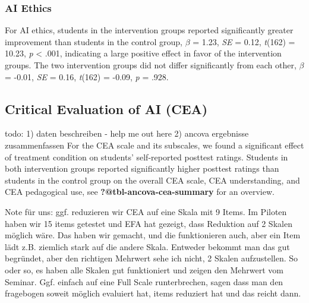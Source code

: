 \documentclass[
  letterpaper,
  DIV=11,
  numbers=noendperiod]{scrartcl}
\begin{document}
\subsubsection{AI Ethics}\label{ai-ethics}

For AI ethics, students in the intervention groups reported
significantly greater improvement than students in the control group,
\(\beta\) = 1.23, \emph{SE} = 0.12, \emph{t}(162) = 10.23, \emph{p}
\textless{} .001, indicating a large positive effect in favor of the
intervention groups. The two intervention groups did not differ
significantly from each other, \(\beta\) = -0.01, \emph{SE} = 0.16,
\emph{t}(162) = -0.09, \emph{p} = .928.

\subsection{Critical Evaluation of AI
(CEA)}\label{critical-evaluation-of-ai-cea}

todo: 1) daten beschreiben - help me out here 2) ancova ergebnisse
zusammenfassen For the CEA scale and its subscales, we found a
significant effect of treatment condition on students' self-reported
posttest ratings. Students in both intervention groups reported
significantly higher posttest ratings than students in the control group
on the overall CEA scale, CEA understanding, and CEA pedagogical use,
see \textbf{?@tbl-ancova-cea-summary} for an overview.

\begin{tcolorbox}[enhanced jigsaw, breakable, colback=white, opacitybacktitle=0.6, colbacktitle=quarto-callout-note-color!10!white, leftrule=.75mm, colframe=quarto-callout-note-color-frame, toprule=.15mm, opacityback=0, coltitle=black, bottomrule=.15mm, bottomtitle=1mm, toptitle=1mm, titlerule=0mm, title=\textcolor{quarto-callout-note-color}{\faInfo}\hspace{0.5em}{Note}, arc=.35mm, rightrule=.15mm, left=2mm]

Note für uns: ggf. reduzieren wir CEA auf eine Skala mit 9 Items. Im
Piloten haben wir 15 items getestet und EFA hat gezeigt, dass Reduktion
auf 2 Skalen möglich wäre. Das haben wir gemacht, und die funktionieren
auch, aber ein Item lädt z.B. ziemlich stark auf die andere Skala.
Entweder bekommt man das gut begründet, aber den richtigen Mehrwert sehe
ich nicht, 2 Skalen aufzustellen. So oder so, es haben alle Skalen gut
funktioniert und zeigen den Mehrwert vom Seminar. Ggf. einfach auf eine
Full Scale runterbrechen, sagen dass man den fragebogen soweit möglich
evaluiert hat, items reduziert hat und das reicht dann.

\end{tcolorbox}
\end{document}
